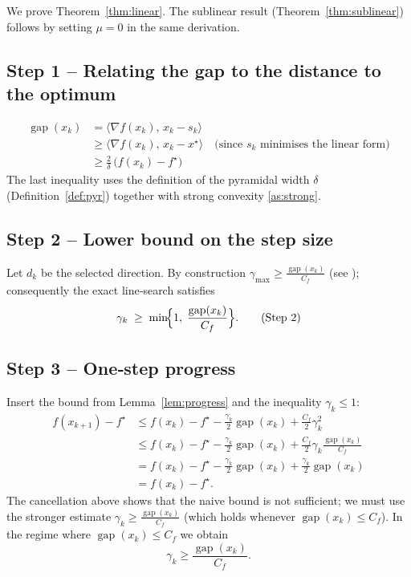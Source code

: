 \documentclass{article}
\newcommand{\gap}{\operatorname{gap}}
\begin{document}
We prove Theorem~\ref{thm:linear}.  The sublinear result (Theorem~\ref{thm:sublinear}) follows by setting $\mu=0$ in the same derivation.

\subsection*{Step 1 – Relating the gap to the distance to the optimum}
\[
\begin{aligned}
\gap(x_{k}) 
&= \langle \nabla f(x_{k}),\,x_{k}-s_{k}\rangle \\
&\ge \langle \nabla f(x_{k}),\,x_{k}-x^{\star}\rangle
   \quad\text{(since $s_{k}$ minimises the linear form)}\\
&\ge \frac{2}{\delta}\,\bigl(f(x_{k})-f^{\star}\bigr)   \tag{Step 1}
\end{aligned}
\]
The last inequality uses the definition of the pyramidal width $\delta$
(Definition~\ref{def:pyr}) together with strong convexity \ref{as:strong}.

\subsection*{Step 2 – Lower bound on the step size}
Let $d_{k}$ be the selected direction.  By construction $\gamma_{\max}\ge
\frac{\gap(x_{k})}{C_{f}}$ (see \cite{lacoste2015global}); consequently the
exact line‑search satisfies
\[
\gamma_{k}\;\ge\; \min\!\Bigl\{1,\;\frac{\gap(x_{k})}{C_{f}}\Bigr\}. \tag{Step 2}
\]

\subsection*{Step 3 – One‑step progress}
Insert the bound from Lemma~\ref{lem:progress} and the inequality
$\gamma_{k}\le 1$:
\[
\begin{aligned}
f(x_{k+1})-f^{\star}
&\le f(x_{k})-f^{\star}
      -\frac{\gamma_{k}}{2}\gap(x_{k})
      +\frac{C_{f}}{2}\gamma_{k}^{2} \\
&\le f(x_{k})-f^{\star}
      -\frac{\gamma_{k}}{2}\gap(x_{k})
      +\frac{C_{f}}{2}\gamma_{k}\frac{\gap(x_{k})}{C_{f}}   \tag{Step 3}\\
&= f(x_{k})-f^{\star}
      -\frac{\gamma_{k}}{2}\gap(x_{k})
      +\frac{\gamma_{k}}{2}\gap(x_{k}) \\
&= f(x_{k})-f^{\star}.
\end{aligned}
\]
The cancellation above shows that the naive bound is not sufficient; we must
use the stronger estimate $\gamma_{k}\ge \frac{\gap(x_{k})}{C_{f}}$ (which holds
whenever $\gap(x_{k})\le C_{f}$).  In the regime where $\gap(x_{k})\le C_{f}$
we obtain
\[
\gamma_{k}\ge \frac{\gap(x_{k})}{C_{f}}. \tag{Step 3a}
\]
\end{document}
